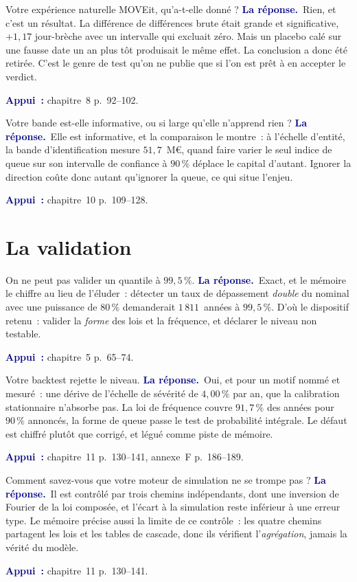 \documentclass[11pt,a4paper]{article}
\newcommand{\rep}[1]{\smallskip\noindent\textcolor{navy}{\textbf{La réponse.}}\ #1\par}
\newcommand{\appui}[1]{\smallskip\noindent\small\textcolor{navy}{\textbf{Appui~:}} #1\par\normalsize}
\begin{document}
\begin{question}{\og Votre expérience naturelle MOVEit, qu'a-t-elle donné ?\fg{}}
\rep{Rien, et c'est un résultat. La différence de différences brute était grande et
significative, $+1{,}17$ jour-brèche avec un intervalle qui excluait zéro. Mais un placebo calé
sur une fausse date un an plus tôt produisait le même effet. La conclusion a donc été retirée.
C'est le genre de test qu'on ne publie que si l'on est prêt à en accepter le verdict.}
\appui{chapitre~8 p.~92--102.}
\end{question}

\begin{question}{\og Votre bande est-elle informative, ou si large qu'elle n'apprend rien ?\fg{}}
\rep{Elle est informative, et la comparaison le montre~: à l'échelle d'entité, la bande
d'identification mesure $51{,}7$~M\euro, quand faire varier le seul indice de queue sur son
intervalle de confiance à $90\,\%$ déplace le capital d'autant. Ignorer la direction coûte donc
autant qu'ignorer la queue, ce qui situe l'enjeu.}
\appui{chapitre~10 p.~109--128.}
\end{question}

\section{La validation}

\begin{question}{\og On ne peut pas valider un quantile à $99{,}5\,\%$.\fg{}}
\rep{Exact, et le mémoire le chiffre au lieu de l'éluder~: détecter un taux de dépassement
\emph{double} du nominal avec une puissance de $80\,\%$ demanderait $1\,811$~années à
$99{,}5\,\%$. D'où le dispositif retenu~: valider la \emph{forme} des lois et la fréquence, et
déclarer le niveau non testable.}
\appui{chapitre~5 p.~65--74.}
\end{question}

\begin{question}{\og Votre backtest rejette le niveau.\fg{}}
\rep{Oui, et pour un motif nommé et mesuré~: une dérive de l'échelle de sévérité de
$4{,}00\,\%$ par an, que la calibration stationnaire n'absorbe pas. La loi de fréquence couvre
$91{,}7\,\%$ des années pour $90\,\%$ annoncés, la forme de queue passe le test de probabilité
intégrale. Le défaut est chiffré plutôt que corrigé, et légué comme piste de mémoire.}
\appui{chapitre~11 p.~130--141, annexe~F p.~186--189.}
\end{question}

\begin{question}{\og Comment savez-vous que votre moteur de simulation ne se trompe pas ?\fg{}}
\rep{Il est contrôlé par trois chemins indépendants, dont une inversion de Fourier de la loi
composée, et l'écart à la simulation reste inférieur à une erreur type. Le mémoire précise aussi
la limite de ce contrôle~: les quatre chemins partagent les lois et les tables de cascade, donc
ils vérifient l'\emph{agrégation}, jamais la vérité du modèle.}
\appui{chapitre~11 p.~130--141.}
\end{question}
\end{document}
